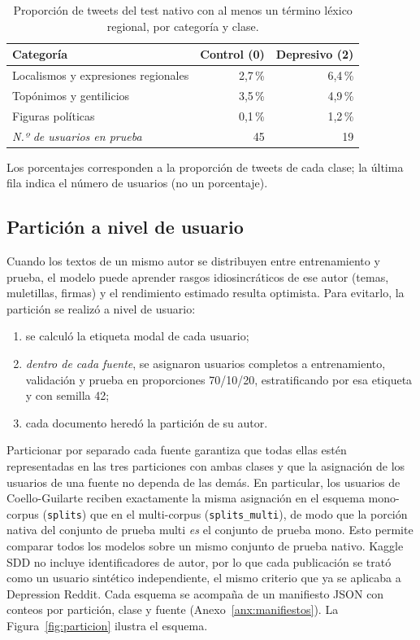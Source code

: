 \documentclass[12pt,a4paper]{article}
\begin{document}
\begin{table}[H]
\centering
\small
\caption{Proporción de tweets del test nativo con al menos un término léxico regional, por categoría y clase.}
\label{tab:marcadores_dialecto}
\begin{tabular}{lrr}
\toprule
\textbf{Categoría} & \textbf{Control (0)} & \textbf{Depresivo (2)} \\
\midrule
Localismos y expresiones regionales & 2{,}7\,\% & 6{,}4\,\% \\
Topónimos y gentilicios             & 3{,}5\,\% & 4{,}9\,\% \\
Figuras políticas                   & 0{,}1\,\% & 1{,}2\,\% \\
\midrule
\textit{N.º de usuarios en prueba} & 45 & 19 \\
\bottomrule
\end{tabular}

\vspace{0.15cm}
{\footnotesize Los porcentajes corresponden a la proporción de tweets de cada clase; la última fila indica el número de usuarios (no un porcentaje).}
\end{table}

\subsection{Partición a nivel de usuario}
\label{sec:particion}
Cuando los textos de un mismo autor se distribuyen entre entrenamiento y prueba, el modelo puede aprender rasgos idiosincráticos de ese autor (temas, muletillas, firmas) y el rendimiento estimado resulta optimista. Para evitarlo, la partición se realizó a nivel de usuario:
\begin{enumerate}[leftmargin=2em]
    \item se calculó la etiqueta modal de cada usuario;
    \item \emph{dentro de cada fuente}, se asignaron usuarios completos a entrenamiento, validación y prueba en proporciones 70/10/20, estratificando por esa etiqueta y con semilla 42;
    \item cada documento heredó la partición de su autor.
\end{enumerate}
Particionar por separado cada fuente garantiza que todas ellas estén representadas en las tres particiones con ambas clases y que la asignación de los usuarios de una fuente no dependa de las demás. En particular, los usuarios de Coello-Guilarte reciben exactamente la misma asignación en el esquema mono-corpus (\texttt{splits}) que en el multi-corpus (\texttt{splits\_multi}), de modo que la porción nativa del conjunto de prueba multi \emph{es} el conjunto de prueba mono. Esto permite comparar todos los modelos sobre un mismo conjunto de prueba nativo. Kaggle SDD no incluye identificadores de autor, por lo que cada publicación se trató como un usuario sintético independiente, el mismo criterio que ya se aplicaba a Depression Reddit. Cada esquema se acompaña de un manifiesto JSON con conteos por partición, clase y fuente (Anexo~\ref{anx:manifiestos}). La Figura~\ref{fig:particion} ilustra el esquema.
\end{document}
